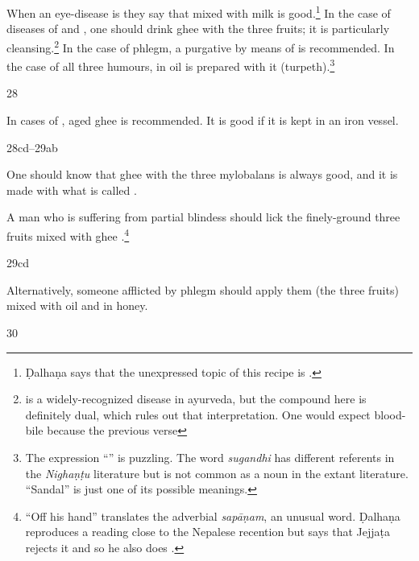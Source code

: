\begin{translation}
    When an eye-disease is  they say that
     mixed with milk is good.\footnote{Ḍalhaṇa says
    that the unexpressed topic of this recipe is .} In
    the case of diseases of  and , one should drink
    ghee with the three fruits; it is particularly
    cleansing.\footnote{ is a
    widely-recognized disease in ayurveda, but the compound here is definitely dual,
    which rules out that interpretation. One would expect blood-bile because the
    previous verse } In the case of phlegm, a purgative by means of
     is recommended. In the case of all three humours,
     in oil is prepared with it (turpeth).\footnote{The expression 
    “” is puzzling. The word \emph{sugandhi} 
    has different referents in the \emph{Nighaṇṭu} literature but is not common as a 
    noun in the extant literature. “Sandal” is just one of its possible meanings.}
    
    \item[28]
    
    In cases of , aged ghee is recommended.  It is good if 
    it is kept in an iron vessel.
    
    \item [28cd--29ab]
    
    One should know that ghee with the three mylobalans is always good, and it is made
    with what is called .
    
    A man who is suffering from partial blindess should lick the finely-ground three fruits 
    mixed with ghee .\footnote{“Off his hand” translates the 
    adverbial \emph{sapāṇam}, an unusual word. Ḍalhaṇa reproduces a reading close 
    to the Nepalese recention but says that Jejjaṭa rejects it and so he also does 
    \citep[627]{susr-trikamji3}.}
    
    \item[29cd]
    
    Alternatively, someone afflicted by phlegm should apply them (the three fruits)
    mixed with oil and  in honey.
    
    \item[30]
    

\end{translation}
